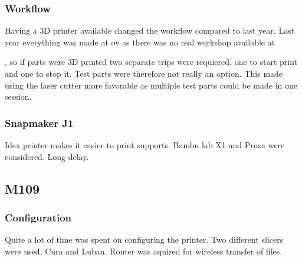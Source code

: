 \subsubsection{Workflow}
Having a 3D printer available changed the workflow compared to last year.
Last year everything was made at \gls{ov} as there was no real workshop available at

, so if parts were 3D printed two separate trips were requiered, one to start print and one to stop it.
Test parts were therefore not really an option.
This made using the laser cutter more favorable as multiple test parts could be made in one session.

\subsubsection{Snapmaker J1}
Idex printer makes it easier to print supports.
Bambu lab X1 and Prusa were considered.
Long delay.

\subsection{M109}

\subsubsection{Configuration}
Quite a lot of time was spent on configuring the printer.
Two different slicers were used, Cura and Luban.
Router was aquired for wireless transfer of files.
